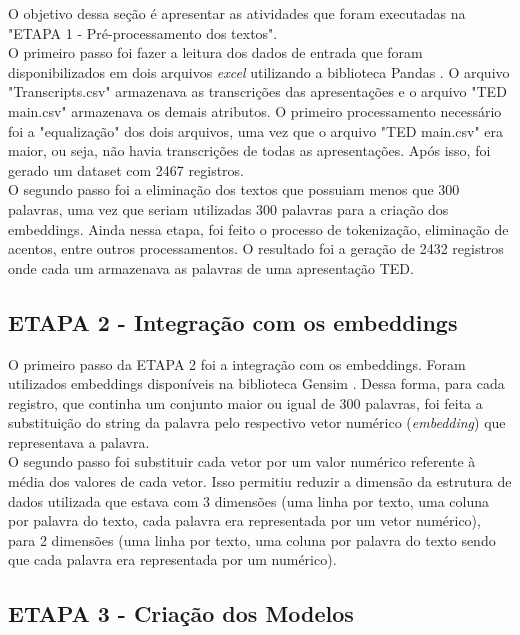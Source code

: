 \documentclass{article}
\begin{document}
O objetivo dessa seção é apresentar as atividades que foram executadas na "ETAPA 1 - Pré-processamento dos textos".\\

O primeiro passo foi fazer a leitura dos dados de entrada que foram disponibilizados em dois arquivos \textit{excel} utilizando a biblioteca Pandas \citep{pandas}. O arquivo "Transcripts.csv" armazenava as transcrições das apresentações e o arquivo "TED main.csv" armazenava os demais atributos. O primeiro processamento necessário foi a "equalização" dos dois arquivos, uma vez que o arquivo "TED main.csv" era maior, ou seja, não havia transcrições de todas as apresentações. Após isso, foi gerado um dataset com 2467 registros.\\

O segundo passo foi a eliminação dos textos que possuiam menos que 300 palavras, uma vez que seriam utilizadas 300 palavras para a criação dos embeddings. Ainda nessa etapa, foi feito o processo de tokenização, eliminação de acentos, entre outros processamentos. O resultado foi a geração de 2432 registros onde cada um armazenava as palavras de uma apresentação TED.

\subsection{ETAPA 2 - Integração com os embeddings}

O primeiro passo da ETAPA 2 foi a integração com os embeddings. Foram utilizados embeddings disponíveis na biblioteca Gensim \citep{gensim}. Dessa forma, para cada registro, que continha um conjunto maior ou igual de 300 palavras, foi feita a substituição do string da palavra pelo respectivo vetor numérico (\textit{embedding}) que representava a palavra.\\

O segundo passo foi substituir cada vetor por um valor numérico referente à média dos valores de cada vetor. Isso permitiu reduzir a dimensão da estrutura de dados utilizada que estava com 3 dimensões (uma linha por texto, uma coluna por palavra do texto, cada palavra era representada por um vetor numérico), para 2 dimensões (uma linha por texto, uma coluna por palavra do texto sendo que cada palavra era representada por um numérico).

\subsection{ETAPA 3 - Criação dos Modelos}
\end{document}
